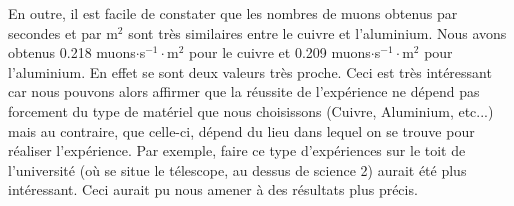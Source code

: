 \documentclass[12pt]{article}
\begin{document}
    En outre, il est facile de constater que les nombres de muons obtenus par secondes et par m$^{2}$ sont très similaires entre le cuivre et l'aluminium. Nous avons obtenus 0.218 muons$\cdot$s$^{-1}\cdot$m$^{2}$ pour le cuivre et 0.209 muons$\cdot$s$^{-1}\cdot$m$^{2}$ pour l'aluminium. En effet se sont deux valeurs très proche. Ceci est très intéressant car nous pouvons alors affirmer que la réussite de l'expérience ne dépend pas forcement du type de matériel que nous choisissons (Cuivre, Aluminium, etc...) mais au contraire, que celle-ci, dépend du lieu dans lequel on se trouve pour réaliser l'expérience. Par exemple, faire ce type d'expériences sur le toit de l'université (où se situe le télescope, au dessus de science 2) aurait été plus intéressant. Ceci aurait pu nous amener à des résultats plus précis. 

\end{document}
